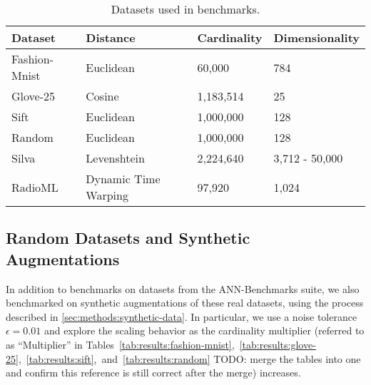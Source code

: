 \begin{table}[!t]
    \caption{Datasets used in benchmarks.}
    \label{tab:datasets:summary}
    \vskip 0.15in
    \begin{center}
        \begin{small}
            \begin{sc}
                \begin{tabular}{|l|l|l|l|}
                    \hline
                    \textbf{Dataset} & \textbf{Distance}  &\textbf{Cardinality}  & \textbf{Dimensionality}  \\
                    \hline
                    Fashion-Mnist    & Euclidean              & 60,000             & 784                    \\
                    \hline
                    Glove-25         & Cosine                 & 1,183,514          & 25                     \\
                    \hline
                    Sift             & Euclidean              & 1,000,000          & 128                    \\
                    \hline
                    Random           & Euclidean              & 1,000,000          & 128                    \\
                    \hline
                    Silva            & Levenshtein            & 2,224,640          & 3,712 - 50,000         \\
                    \hline
                    RadioML          & Dynamic Time Warping   & 97,920             & 1,024                  \\
                    \hline
                \end{tabular}
            \end{sc}
        \end{small}
    \end{center}
    \vskip -0.1in
\end{table}

\subsection{Random Datasets and Synthetic Augmentations}
\label{sec:datasets-and-benchmarks:random-datasets}

In addition to benchmarks on datasets from the ANN-Benchmarks suite, we also benchmarked on synthetic augmentations of these real datasets, using the process described in \ref{sec:methods:synthetic-data}. 
In particular, we use a noise tolerance $\epsilon = 0.01$ and explore the scaling behavior as the cardinality multiplier (referred to as ``Multiplier'' in Tables~\ref{tab:results:fashion-mnist},~\ref{tab:results:glove-25},~\ref{tab:results:sift},~and~\ref{tab:results:random} {\color{red} TODO: merge the tables into one and confirm this reference is still correct after the merge}) increases. 

